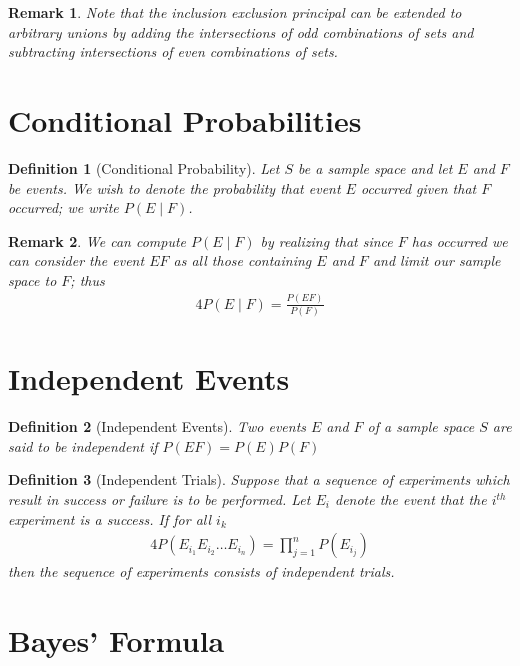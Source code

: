 \documentclass[11pt, oneside]{book}   	%
\newtheorem{definition}{Definition}
\newtheorem{remark}{Remark}
\begin{document}
\begin{remark}
	Note that the inclusion exclusion principal can be extended to arbitrary unions by adding the intersections of odd combinations of sets and subtracting intersections of even combinations of sets. 
\end{remark}

\section{Conditional Probabilities}
\begin{definition}[Conditional Probability]
	Let $S$ be a sample space and let $E$ and $F$ be events. We wish to denote the probability that event $E$ occurred given that $F$ occurred; we write $P(E\mid F)$.
\end{definition}

\begin{remark}
	We can compute $P(E\mid F)$ by realizing that since $F$ has occurred we can consider the event $EF$ as all those containing $E$ and $F$ and limit our sample space to $F$; thus
	\begin{alignat}{4}
		P(E\mid F)=\frac{P(EF)}{P(F)}
	\end{alignat} 
\end{remark}

\section{Independent Events}

\begin{definition}[Independent Events]
	Two events $E$ and $F$ of a sample space $S$ are said to be independent if $P(EF)=P(E)P(F)$
\end{definition}

\begin{definition}[Independent Trials]
	Suppose that a sequence of experiments which result in success or failure is to be performed. Let $E_i$ denote the event that the $i^{th}$ experiment is a success. If for all $i_k$
	\begin{alignat}{4}
		P(E_{i_1}E_{i_2}\dots E_{i_n})=\prod_{j=1}^nP(E_{i_j}) 
	\end{alignat}
	then the sequence of experiments consists of independent trials. 
\end{definition}

\section{Bayes' Formula}
\end{document}
